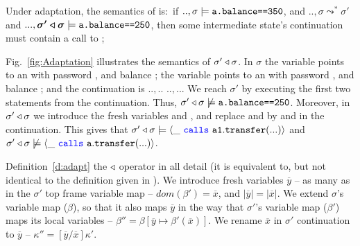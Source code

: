 Under adaptation, the semantics of \Sadapt is:\  if $..,\sigma \models {\texttt{a.balance==350}}$,
and  $.., \sigma \leadsto^* \sigma'$ and $..., \boldsymbol{\sigma' \triangleleft \sigma} \models {\texttt{a.balance==250}}$,
then {some intermediate state's continuation must contain  a call to };
 
Fig.~\ref{fig:Adaptation} illustrates the semantics of $\sigma' \triangleleft \sigma$. In   $\sigma$ the variable  points to an 
 with password , and balance ;  the variable  points to an 
  with password , and balance ; and the continuation is $..,..$\prg{);} 
$..,..$\prg{);}. 
We reach $\sigma'$ by executing the first two statements from the continuation.
Thus,  ${\sigma' \triangleleft \sigma}\not\models {\texttt{a.balance==250}}$.
Moreover, in $\sigma' \triangleleft \sigma$ we introduce the fresh variables  and , and replace  and
 by  and  in the continuation.
This gives that ${\sigma' \triangleleft \sigma} \models \langle \_\ {\color{blue}\texttt{calls}}\ {\texttt{a1}}.{\texttt{transfer}}(...) \rangle$ and  ${\sigma' \triangleleft \sigma}\not\models \langle \_\ {\color{blue}\texttt{calls}}\ {\texttt{a}}.{\texttt{transfer}}(...) \rangle$.

 

Definition~\ref{d:adapt}  the $\triangleleft$ operator in all detail
(it is equivalent to, but not identical to the definition  given in \cite{FASE}).
We introduce fresh variables  $\overline{y}$ -- as many as in the $\sigma'$ top frame variable map
-- $dom(\beta')=\overline{x}$,  and $|\overline{y}| = |\overline{x}|$.  
We extend $\sigma$'s variable map ($\beta$), so that it also maps $\overline{y}$ 
in the way that  $\sigma'$'s variable map ($\beta'$) maps its local variables -- $\beta'' =  \beta[\overline{y} \mapsto  {\beta'(\overline{x})}]$. We rename $\overline{x}$   in $\sigma'$ continuation
to $\overline{y}$ --  $\kappa''=[\overline{y}/\overline{x}]\kappa'$.

 
 
